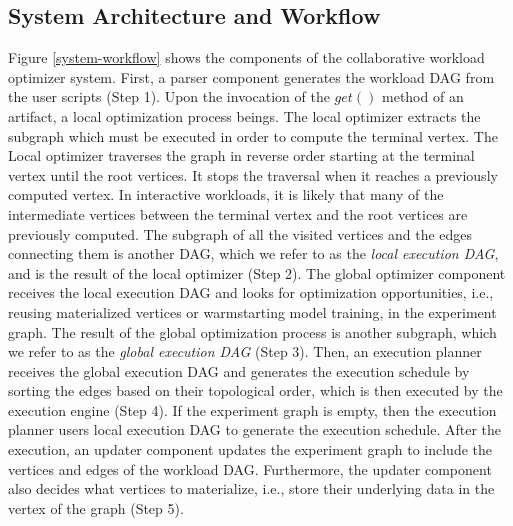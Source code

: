 \subsection{System Architecture and Workflow}
Figure \ref{system-workflow} shows the components of the collaborative workload optimizer system.
First, a parser component generates the workload DAG from the user scripts (Step 1).
Upon the invocation of the $get()$ method of an artifact, a local optimization process beings.
The local optimizer extracts the subgraph which must be executed in order to compute the terminal vertex.
The Local optimizer traverses the graph in reverse order starting at the terminal vertex until the root vertices.
It stops the traversal when it reaches a previously computed vertex.
In interactive workloads, it is likely that many of the intermediate vertices between the terminal vertex and the root vertices are previously computed.
The subgraph of all the visited vertices and the edges connecting them is another DAG, which we refer to as the \textit{local execution DAG}, and is the result of the local optimizer (Step 2).
The global optimizer component receives the local execution DAG and looks for optimization opportunities, i.e., reusing materialized vertices or warmstarting model training, in the experiment graph.
The result of the global optimization process is another subgraph, which we refer to as the \textit{global execution DAG} (Step 3).
Then, an execution planner receives the global execution DAG and generates the execution schedule by sorting the edges based on their topological order, which is then executed by the execution engine (Step 4).
If the experiment graph is empty, then the execution planner users local execution DAG to generate the execution schedule.
After the execution, an updater component updates the experiment graph to include the vertices and edges of the workload DAG.
Furthermore, the updater component also decides what vertices to materialize, i.e., store their underlying data in the vertex of the graph (Step 5).

